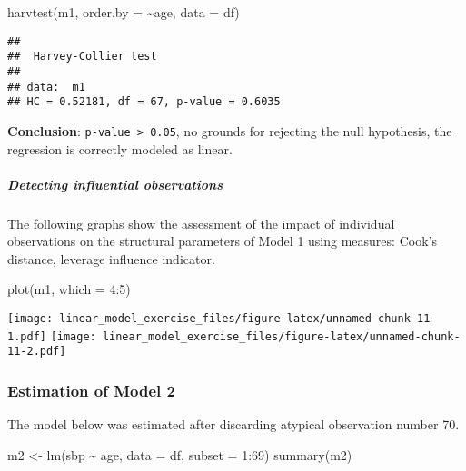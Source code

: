 \documentclass[
]{article}
\newenvironment{Shaded}{\begin{snugshade}}{\end{snugshade}}
\newcommand{\AttributeTok}[1]{\textcolor[rgb]{0.77,0.63,0.00}{#1}}
\newcommand{\DecValTok}[1]{\textcolor[rgb]{0.00,0.00,0.81}{#1}}
\newcommand{\FunctionTok}[1]{\textcolor[rgb]{0.00,0.00,0.00}{#1}}
\newcommand{\NormalTok}[1]{#1}
\newcommand{\OtherTok}[1]{\textcolor[rgb]{0.56,0.35,0.01}{#1}}
\newcommand{\SpecialCharTok}[1]{\textcolor[rgb]{0.00,0.00,0.00}{#1}}
\begin{document}
\begin{Shaded}
\begin{Highlighting}[]
\FunctionTok{harvtest}\NormalTok{(m1, }\AttributeTok{order.by =} \SpecialCharTok{\textasciitilde{}}\NormalTok{age, }\AttributeTok{data =}\NormalTok{ df)}
\end{Highlighting}
\end{Shaded}

\begin{verbatim}
## 
##  Harvey-Collier test
## 
## data:  m1
## HC = 0.52181, df = 67, p-value = 0.6035
\end{verbatim}

\textbf{Conclusion}: \texttt{p-value\ \textgreater{}\ 0.05}, no grounds
for rejecting the null hypothesis, the regression is correctly modeled
as linear.

\hypertarget{detecting-influential-observations}{%
\subparagraph{Detecting influential
observations}\label{detecting-influential-observations}}

The following graphs show the assessment of the impact of individual
observations on the structural parameters of Model 1 using measures:
Cook's distance, leverage influence indicator.

\begin{Shaded}
\begin{Highlighting}[]
\FunctionTok{plot}\NormalTok{(m1, }\AttributeTok{which =} \DecValTok{4}\SpecialCharTok{:}\DecValTok{5}\NormalTok{)}
\end{Highlighting}
\end{Shaded}

\texttt{[image: linear\_model\_exercise\_files/figure-latex/unnamed-chunk-11-1.pdf]}
\texttt{[image: linear\_model\_exercise\_files/figure-latex/unnamed-chunk-11-2.pdf]}

\hypertarget{estimation-of-model-2}{%
\subsubsection{Estimation of Model 2}\label{estimation-of-model-2}}

The model below was estimated after discarding atypical observation
number 70.

\begin{Shaded}
\begin{Highlighting}[]
\NormalTok{m2 }\OtherTok{\textless{}{-}} \FunctionTok{lm}\NormalTok{(sbp }\SpecialCharTok{\textasciitilde{}}\NormalTok{ age, }\AttributeTok{data =}\NormalTok{ df, }\AttributeTok{subset =} \DecValTok{1}\SpecialCharTok{:}\DecValTok{69}\NormalTok{)}
\FunctionTok{summary}\NormalTok{(m2)}
\end{Highlighting}
\end{Shaded}
\end{document}
